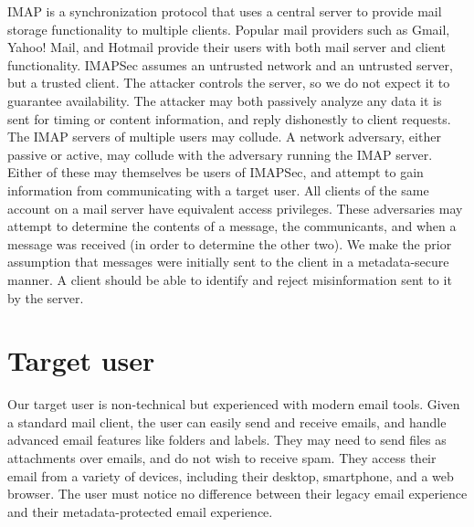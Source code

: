 \documentclass[pageno]{jpaper}
\newcommand{\project}{IMAPSec }
\newcommand{\projectnospace}{IMAPSec}
\begin{document}
IMAP is a synchronization protocol that uses a central server to provide mail storage functionality to multiple clients. Popular mail providers such as Gmail, Yahoo! Mail, and Hotmail provide their users with both mail server and client functionality. \project assumes an untrusted network and an untrusted server, but a trusted client. The attacker controls the server, so we do not expect it to guarantee availability. The attacker may both passively analyze any data it is sent for timing or content information, and reply dishonestly to client requests. The IMAP servers of multiple users may collude. A network adversary, either passive or active, may collude with the adversary running the IMAP server. Either of these may themselves be users of \projectnospace, and attempt to gain information from communicating with a target user. All clients of the same account on a mail server have equivalent access privileges. These adversaries may attempt to determine the contents of a message, the communicants, and when a message was received (in order to determine the other two). We make the prior assumption that messages were initially sent to the client in a metadata-secure manner. A client should be able to identify and reject misinformation sent to it by the server.


\label{targetuser}
\section{Target user}

Our target user is non-technical but experienced with modern email tools. Given a standard mail client, the user can easily send and receive emails, and handle advanced email features like folders and labels. They may need to send files as attachments over emails, and do not wish to receive spam. They access their email from a variety of devices, including their desktop, smartphone, and a web browser. The user must notice no difference between their legacy email experience and their metadata-protected email experience.
\end{document}
